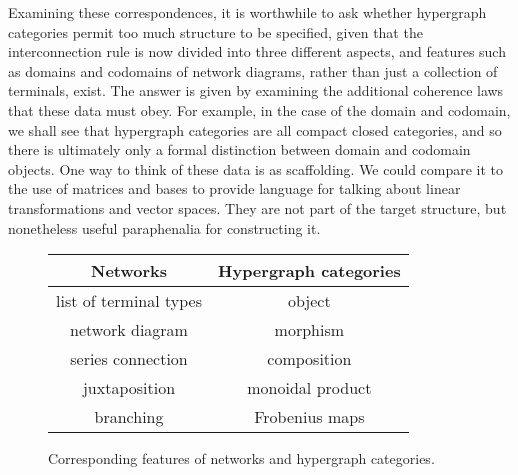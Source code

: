 Examining these correspondences, it is worthwhile to ask whether hypergraph
categories permit too much structure to be specified, given that the
interconnection rule is now divided into three different aspects, and features
such as domains and codomains of network diagrams, rather than just a collection
of terminals, exist. The answer is given by examining the additional coherence
laws that these data must obey. For example, in the case of the domain and
codomain, we shall see that hypergraph categories are all compact closed
categories, and so there is ultimately only a formal distinction between domain
and codomain objects. One way to think of these data is as scaffolding. We could
compare it to the use of matrices and bases to provide language for talking
about linear transformations and vector spaces.  They are not part of the target
structure, but nonetheless useful paraphenalia for constructing it.

\begin{figure}
  \begin{center}
  \begin{tabular}{c|c}
    Networks & Hypergraph categories \\
    \hline 
    list of terminal types & object \\
    network diagram & morphism \\
    series connection & composition \\
    juxtaposition & monoidal product \\
    branching & Frobenius maps
  \end{tabular}
  \end{center}
  \caption{Corresponding features of networks and hypergraph categories.}
\end{figure}


